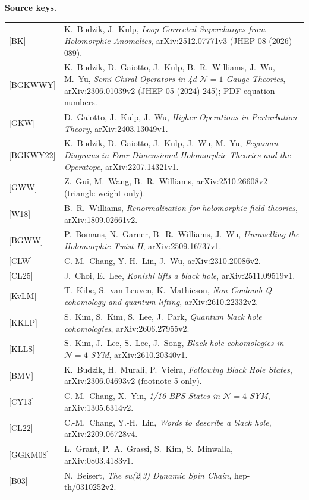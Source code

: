 \documentclass[11pt]{article}
\theoremstyle{definition}
\begin{document}
\textbf{Source keys.}
\begin{longtable}{p{2.3cm}p{13.7cm}}
{[BK]} & K.~Budzik, J.~Kulp, \emph{Loop Corrected Supercharges from Holomorphic Anomalies}, arXiv:2512.07771v3 (JHEP 08 (2026) 089).\\
{[BGKWWY]} & K.~Budzik, D.~Gaiotto, J.~Kulp, B.~R.~Williams, J.~Wu, M.~Yu, \emph{Semi-Chiral Operators in 4d $\mathcal N=1$ Gauge Theories}, arXiv:2306.01039v2 (JHEP 05 (2024) 245); PDF equation numbers.\\
{[GKW]} & D.~Gaiotto, J.~Kulp, J.~Wu, \emph{Higher Operations in Perturbation Theory}, arXiv:2403.13049v1.\\
{[BGKWY22]} & K.~Budzik, D.~Gaiotto, J.~Kulp, J.~Wu, M.~Yu, \emph{Feynman Diagrams in Four-Dimensional Holomorphic Theories and the Operatope}, arXiv:2207.14321v1.\\
{[GWW]} & Z.~Gui, M.~Wang, B.~R.~Williams, arXiv:2510.26608v2 (triangle weight only).\\
{[W18]} & B.~R.~Williams, \emph{Renormalization for holomorphic field theories}, arXiv:1809.02661v2.\\
{[BGWW]} & P.~Bomans, N.~Garner, B.~R.~Williams, J.~Wu, \emph{Unravelling the Holomorphic Twist II}, arXiv:2509.16737v1.\\
{[CLW]} & C.-M.~Chang, Y.-H.~Lin, J.~Wu, arXiv:2310.20086v2.\\
{[CL25]} & J.~Choi, E.~Lee, \emph{Konishi lifts a black hole}, arXiv:2511.09519v1.\\
{[KvLM]} & T.~Kibe, S.~van Leuven, K.~Mathieson, \emph{Non-Coulomb Q-cohomology and quantum lifting}, arXiv:2610.22332v2.\\
{[KKLP]} & S.~Kim, S.~Kim, S.~Lee, J.~Park, \emph{Quantum black hole cohomologies}, arXiv:2606.27955v2.\\
{[KLLS]} & S.~Kim, J.~Lee, S.~Lee, J.~Song, \emph{Black hole cohomologies in $\mathcal N=4$ SYM}, arXiv:2610.20340v1.\\
{[BMV]} & K.~Budzik, H.~Murali, P.~Vieira, \emph{Following Black Hole States}, arXiv:2306.04693v2 (footnote 5 only).\\
{[CY13]} & C.-M.~Chang, X.~Yin, \emph{1/16 BPS States in $\mathcal N=4$ SYM}, arXiv:1305.6314v2.\\
{[CL22]} & C.-M.~Chang, Y.-H.~Lin, \emph{Words to describe a black hole}, arXiv:2209.06728v4.\\
{[GGKM08]} & L.~Grant, P.~A.~Grassi, S.~Kim, S.~Minwalla, arXiv:0803.4183v1.\\
{[B03]} & N.~Beisert, \emph{The su(2$|$3) Dynamic Spin Chain}, hep-th/0310252v2.\\

\end{longtable}
\end{document}
